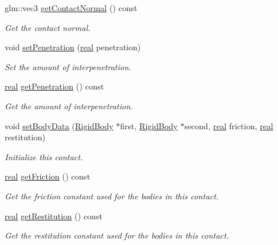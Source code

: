 \begin{DoxyCompactItemize}
glm\+::vec3 \mbox{\hyperlink{classr3_1_1_contact_a2d8f594947a1900fd21e2f707384d9fe}{get\+Contact\+Normal}} () const
\begin{DoxyCompactList}\small\item\em Get the contact normal. \end{DoxyCompactList}\item 
void \mbox{\hyperlink{classr3_1_1_contact_a828feb22ff02fe787739eb5d87cfec38}{set\+Penetration}} (\mbox{\hyperlink{namespacer3_ab2016b3e3f743fb735afce242f0dc1eb}{real}} penetration)
\begin{DoxyCompactList}\small\item\em Set the amount of interpenetration. \end{DoxyCompactList}\item 
\mbox{\hyperlink{namespacer3_ab2016b3e3f743fb735afce242f0dc1eb}{real}} \mbox{\hyperlink{classr3_1_1_contact_afe0f0a9a42b4b1f8bd8a61f0b6a4afdd}{get\+Penetration}} () const
\begin{DoxyCompactList}\small\item\em Get the amount of interpenetration. \end{DoxyCompactList}\item 
void \mbox{\hyperlink{classr3_1_1_contact_af394998586bc05ec666ffbd06b0f7077}{set\+Body\+Data}} (\mbox{\hyperlink{classr3_1_1_rigid_body}{Rigid\+Body}} $\ast$first, \mbox{\hyperlink{classr3_1_1_rigid_body}{Rigid\+Body}} $\ast$second, \mbox{\hyperlink{namespacer3_ab2016b3e3f743fb735afce242f0dc1eb}{real}} friction, \mbox{\hyperlink{namespacer3_ab2016b3e3f743fb735afce242f0dc1eb}{real}} restitution)
\begin{DoxyCompactList}\small\item\em Initialize this contact. \end{DoxyCompactList}\item 
\mbox{\hyperlink{namespacer3_ab2016b3e3f743fb735afce242f0dc1eb}{real}} \mbox{\hyperlink{classr3_1_1_contact_a1a547c3852733960001cc5fe0fe06790}{get\+Friction}} () const
\begin{DoxyCompactList}\small\item\em Get the friction constant used for the bodies in this contact. \end{DoxyCompactList}\item 
\mbox{\hyperlink{namespacer3_ab2016b3e3f743fb735afce242f0dc1eb}{real}} \mbox{\hyperlink{classr3_1_1_contact_a8ec701dcaf82e7fc65bc6c4a2cb6987e}{get\+Restitution}} () const
\begin{DoxyCompactList}\small\item\em Get the restitution constant used for the bodies in this contact. \end{DoxyCompactList}\item 

\end{DoxyCompactItemize}
